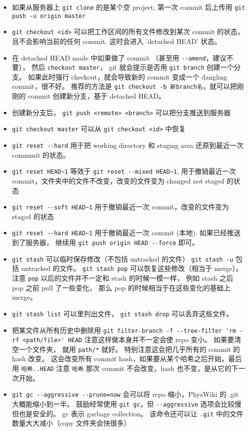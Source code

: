 \begin{itemize}
\item 如果从服务器上 \verb`git clone` 的是某个空 project, 第一次 commit 后上传用 \verb`git push -u origin master`
\item \verb`git checkout <id>` 可以把工作区间的所有文件修改到某次 commit 的状态， 且不会影响当前的任何 commit. 这时会进入 'detached HEAD' 状态。
\item 在 detached HEAD mode 中如果做了 commit （甚至用 \verb`--amend`，建议不要）， 然后 \verb`checkout master`， git 就会提示是否用 \verb`git branch` 创建一个分支。 如果此时强行 checkout，就会导致新的 commit 变成一个 dangling commit，很不好。 推荐的方法是 \verb`git checkout -b 新branch名`，就可以把刚刚的 commit 创建新分支，基于 detached HEAD。
\item 创建新分支后， \verb`git push <remote> <branch>` 可以把分支推送到服务器
\item \verb`git checkout master` 可以从 \verb`git checkout <id>` 中恢复
\item \verb`git reset --hard` 用于把 working directory 和 staging area 还原到最近一次 commmit 的状态。
\item \verb`git reset HEAD~1` 等效于 \verb`git reset --mixed HEAD~1`, 用于撤销最近一次 commit，文件夹中的文件不改变，改变的文件变为 changed not staged 的状态
\item \verb`git reset --soft HEAD~1` 用于撤销最近一次 commit，改变的文件变为 staged 的状态
\item \verb`git reset --hard HEAD~1` 用于撤销最近一次 commit (本地). 如果已经推送到了服务器， 继续用 \verb`git push origin HEAD --force` 即可。
\item \verb`git stash` 可以临时保存修改（不包括 untracked 的文件） \verb`git stash -u` 包括 untracked 的文件。 \verb`git stash pop` 可以恢复这些修改（相当于 merge）。 注意 \verb`pop` 以后的文件并不一定和 stash 的时候一模一样， 例如 stash 之后 pop 之前 pull 了一些变化， 那么 pop 的时候相当于在这些变化的基础上 merge。
\item \verb`git stash list` 可以里列出文件， \verb`git stash drop` 可以丢弃这些文件。
\item 把某文件从所有历史中删除用 \verb`git filter-branch -f --tree-filter 'rm -rf <path/file>' HEAD` 注意这样做本身并不一定会使 repo 变小。 如果要清空一个文件夹， 就用 \verb`path/*` 就好。 特别注意这会把几乎所有的 commit 的 hash 改变。 这会改变所有 commit hash，如果要从某个哈希之后开始，最后用 \verb`哈希..HEAD` 注意 \verb`哈希` 那次 commit 不会改变，hash 也不变，是从它的下一次开始。
\item \verb`git gc --aggressive --prune=now` 会可以将 repo 缩小，PhysWiki 的 .git 大概能缩小到一半。 鼓励经常使用 \verb`git gc`，但 \verb`--aggressive` 选项会比较慢但也是安全的。 gc 表示 garbage collection。 该命令还可以让 \verb`.git` 中的文件数量大大减小（copy 文件夹会快很多）

\end{itemize}
